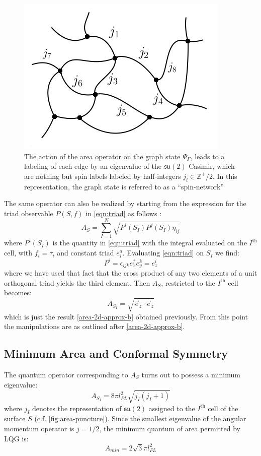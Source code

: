 \documentclass{ws-mpla}
\newcommand{\mbb}[1]{\mathbb{#1}}
\newcommand{\mf}[1]{\mathfrak{#1}}
\begin{document}
\begin{figure}[tbph]
\centering
\includegraphics[width=0.4\linewidth]{network-labelled-j}
\caption{The action of the area operator on the graph state $ \Psi_\Gamma $, leads to a labeling of each edge by an eigenvalue of the $ \mf{su}(2) $ Casimir, which are nothing but spin labels labeled by half-integers $ j_i \in \mbb{Z}^+/2 $. In this representation, the graph state is referred to as a ``spin-network''}
\label{fig:spin-state}
\end{figure}

The same operator can also be realized by starting from the expression for the triad observable $ P(S,f) $ in \eqref{eqn:triad} as follows \cite[Sec 5.1.1]{Ashtekar2004Background}:
\begin{equation}\label{eqn:area-observable}
	A_S = \sum_{I=1}^{N}\sqrt{P^i(S_I) P^j(S_I) \eta_{ij}}
\end{equation}
where $ P^i(S_I) $ is the quantity in \eqref{eqn:triad} with the integral evaluated on the $ I^\text{th} $ cell, with $ f_i = \tau_i $ and constant triad $ e^a_i $. Evaluating \eqref{eqn:triad} on $ S_I $ we find:
\begin{equation}\label{eqn:triad-2}
	P^i = \epsilon_{ijk} e_x^j e_y^k = e_z^i
\end{equation}
where we have used that fact that the cross product of any two elements of a unit orthogonal triad yields the third element. Then $ A_S $, restricted to the $ I^\text{th} $ cell becomes:
\begin{equation}\label{eqn:area-2}
	A_{S_I} = \sqrt{ \vec{e}_z \cdot \vec{e}_z }
\end{equation}
which is just the result \eqref{area-2d-approx-b} obtained previously. From this point the manipulations are as outlined after \eqref{area-2d-approx-b}.

\subsection{Minimum Area and Conformal Symmetry}\label{sec:conformal}

The quantum operator corresponding to $ A_S $ turns out to possess a minimum eigenvalue:
\begin{equation}\label{eqn:area-eigenvalue}
	A_{S_I} = 8\pi l^2_{PL} \sqrt{j_I (j_I + 1)}
\end{equation}
where $ j_I $ denotes the representation of $ \mf{su}(2) $ assigned to the $ I^{\text{th}} $ cell of the surface $ S $ (c.f. \autoref{fig:area-puncture}). Since the smallest eigenvalue of the angular momentum operator is $ j = 1/2 $, the minimum quantum of area permitted by LQG is:
\begin{equation}\label{eqn:area-minimum}
	A_{min} = 2 \sqrt{3} \pi l^2_{PL} 
\end{equation}
\end{document}
